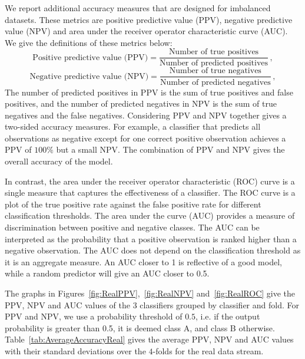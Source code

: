 \documentclass[a4paper,11pt]{article}
\begin{document}
We report additional accuracy measures that are designed for imbalanced datasets. These metrics are positive predictive value (PPV), negative predictive value (NPV) and area under the receiver operator characteristic curve (AUC). We give the definitions of these metrics below:
$$
  \text{Positive predictive value (PPV)} = \frac{ \text{Number of true positives} }{ \text{Number of predicted positives} } \, ,
$$
$$
  \text{Negative predictive value (NPV)} = \frac{ \text{Number of true negatives} }{ \text{Number of predicted negatives} } \, ,
$$
The number of predicted positives in PPV is the sum of true positives and false positives, and the number of predicted negatives in NPV is the sum of true negatives and the false negatives. Considering PPV and NPV together gives a two-sided accuracy measures. For example, a classifier that predicts all observations as negative except for one correct positive observation achieves a PPV of $100\%$ but a small NPV\@. The combination of PPV and NPV gives the overall accuracy of the model.

In contrast, the area under the receiver operator characteristic (ROC) curve is a single measure that captures the effectiveness of a classifier. The ROC curve is a plot of the true positive rate against the false positive rate for different classification thresholds. The area under the curve (AUC) provides a measure of discrimination between positive and negative classes. The AUC can be interpreted as the probability that a positive observation is ranked higher than a negative observation. The AUC does not depend on the classification threshold as it is an aggregate measure. An AUC closer to 1 is reflective of a good model, while a random predictor will give an AUC closer to 0.5.

The graphs in Figures~\ref{fig:RealPPV},~\ref{fig:RealNPV} and~\ref{fig:RealROC} give the PPV, NPV and AUC values of the 3 classifiers grouped by classifier and fold. For PPV and NPV, we use a probability threshold of $0.5$, i.e. if the output probability is greater than 0.5, it is deemed class A, and class B otherwise.  Table~\ref{tab:AverageAccuracyReal} gives the average PPV, NPV and AUC values with their standard deviations over the $4$-folds for the real data stream.


\end{document}
